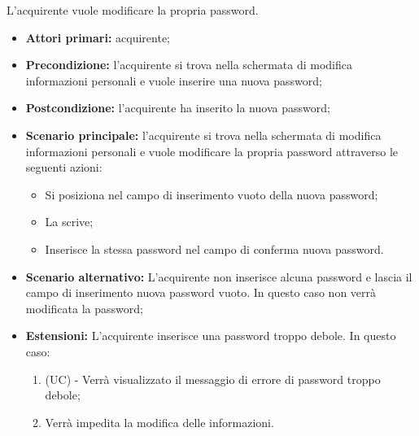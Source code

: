 L'acquirente vuole modificare la propria password.
\begin{itemize}
    \item \textbf{Attori primari:} acquirente;
    \item \textbf{Precondizione:} l'acquirente si trova nella schermata di modifica informazioni personali e vuole inserire una nuova password;
    \item \textbf{Postcondizione:} l'acquirente ha inserito la nuova password;
    \item \textbf{Scenario principale:} l'acquirente si trova nella schermata di modifica informazioni personali e vuole modificare la propria password attraverso le seguenti azioni:
        \begin{itemize}
            \item Si posiziona nel campo di inserimento vuoto della nuova password;
            \item La scrive;
            \item Inserisce la stessa password nel campo di conferma nuova password.
        \end{itemize}
    \item \textbf{Scenario alternativo:} L'acquirente non inserisce alcuna password e lascia il campo di inserimento nuova password vuoto. In questo caso non verrà modificata la password;
    \item \textbf{Estensioni:} L'acquirente inserisce una password troppo debole. In questo caso:
    \begin{enumerate}[label=\lett]
        \item (UC) - Verrà visualizzato il messaggio di errore di password troppo debole;
        \item Verrà impedita la modifica delle informazioni.
    \end{enumerate}
\end{itemize}

